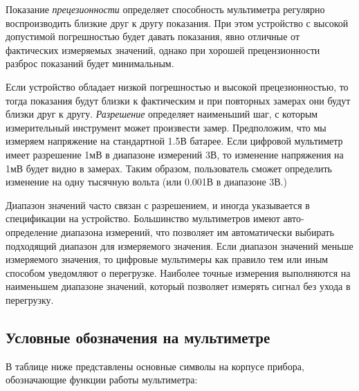 \documentclass[../main.tex]{subfiles}
\begin{document}
Показание \emph{прецезионности} определяет способность мультиметра регулярно
воспроизводить близкие друг к другу показания.  При этом устройство с высокой
допустимой погрешностью будет давать показания, явно отличные от фактических
измеряемых значений, однако при хорошей прецензионности разброс показаний будет
минимальным.

Если устройство обладает низкой погрешностью и высокой прецезионностью, то тогда
показания будут близки к фактическим и при повторных замерах они будут близки
друг к другу.
\emph{Разрешение} определяет наименьший шаг, с которым измерительный инструмент
может произвести замер.  Предположим, что мы измеряем напряжение на стандартной
1.5В батарее.  Если цифровой мультиметр имеет разрешение 1мВ в диапазоне
измерений 3В, то изменение напряжения на 1мВ будет видно в замерах.  Таким
образом, пользователь сможет определить изменение на одну тысячную вольта (или
0.001В в диапазоне 3В.)

Диапазон значений часто связан с разрешением, и иногда указывается в
спецификации на устройство.  Большинство мультиметров имеют авто-определение
диапазона измерений, что позволяет им автоматически выбирать подходящий диапазон
для измеряемого значения.  Если диапазон значений меньше измеряемого значения,
то цифровые мультимеры как правило тем или иным способом уведомляют о
перегрузке.  Наиболее точные измерения выполняются на наименьшем диапазоне
значений, который позволяет измерять сигнал без ухода в перегрузку.

\subsection{Условные обозначения на мультиметре}

В таблице ниже представлены основные символы на корпусе прибора, обозначающие
функции работы мультиметра:
\end{document}
